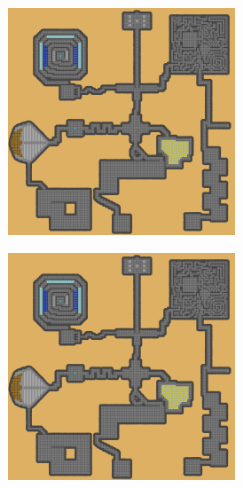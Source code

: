 \documentclass[a4paper, landscape]{article}
\begin{document}
\begin{multicols}{4}
\begin{figure}[H]
		\end{figure}
		\begin{figure}[H]
\includegraphics[trim = 4577 2360 300 2547, clip, height = 6cm, width = 6cm]{Dungeon_playersmap.png}
		\end{figure}
		\begin{figure}[H]
\includegraphics[trim = 4767 2360 110 2547, clip, height = 6cm, width = 6cm]{Dungeon_playersmap.png}
		\end{figure}
		\begin{figure}[H]

\end{figure}
\end{multicols}
\end{document}
